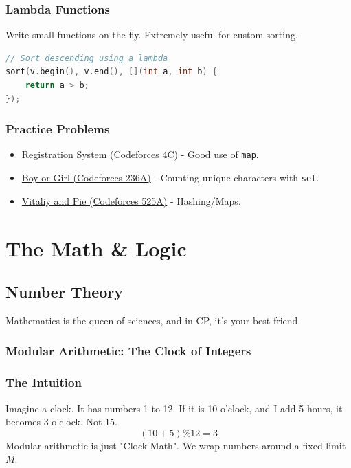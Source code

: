 \documentclass[12pt, a4paper]{report}
\begin{document}
\section{Lambda Functions}
Write small functions on the fly. Extremely useful for custom sorting.
\begin{lstlisting}[language=C++]
// Sort descending using a lambda
sort(v.begin(), v.end(), [](int a, int b) {
    return a > b; 
});
\end{lstlisting}

\section{Practice Problems}
\begin{itemize}
    \item \href{https://codeforces.com/problemset/problem/4/C}{Registration System (Codeforces 4C)} - Good use of \texttt{map}.
    \item \href{https://codeforces.com/problemset/problem/236/A}{Boy or Girl (Codeforces 236A)} - Counting unique characters with \texttt{set}.
    \item \href{https://codeforces.com/problemset/problem/525/A}{Vitaliy and Pie (Codeforces 525A)} - Hashing/Maps.
\end{itemize}

\part{The Math \& Logic}

\chapter{Number Theory}
Mathematics is the queen of sciences, and in CP, it's your best friend.

\section{Modular Arithmetic: The Clock of Integers}
\section{The Intuition}
Imagine a clock. It has numbers 1 to 12.
If it is 10 o'clock, and I add 5 hours, it becomes 3 o'clock. Not 15.
\[ (10 + 5) \% 12 = 3 \]
Modular arithmetic is just "Clock Math". We wrap numbers around a fixed limit $M$.
\end{document}
